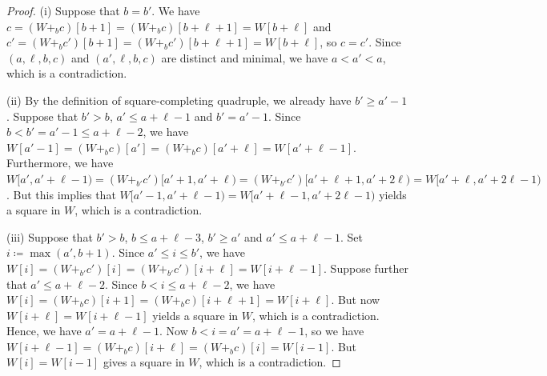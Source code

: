 \documentclass[12pt]{article}
\theoremstyle{plain}
\theoremstyle{definition}
\newcommand{\coleq}{\coloneq}
\begin{document}
	\begin{proof}
		(i) Suppose that $b=b'$. We have $c=(W+_bc)[b+1]=(W+_bc)[b+\ell+1]=W[b+\ell]$ and $c'=(W+_bc')[b+1]=(W+_bc')[b+\ell+1]=W[b+\ell]$, so $c=c'$. Since $(a,\ell,b,c)$ and $(a',\ell,b,c)$ are distinct and minimal, we have $a<a'<a$, which is a contradiction.
		
		(ii) By the definition of square-completing quadruple, we already have $b'\ge a'-1$. Suppose that $b'>b$, $a'\le a+\ell-1$ and $b'=a'-1$. Since $b<b'=a'-1\le a+\ell-2$, we have $W[a'-1]=(W+_bc)[a']=(W+_bc)[a'+\ell]=W[a'+\ell-1]$. Furthermore, we have $W[a',a'+\ell-1)=(W+_{b'}c')[a'+1,a'+\ell)=(W+_{b'}c')[a'+\ell+1,a'+2\ell)=W[a'+\ell,a'+2\ell-1)$. But this implies that $W[a'-1,a'+\ell-1)=W[a'+\ell-1,a'+2\ell-1)$ yields a square in $W$, which is a contradiction.
		
		(iii) Suppose that $b'>b$, $b\le a+\ell-3$, $b'\ge a'$ and $a'\le a+\ell-1$. Set $i\coleq\max(a',b+1)$. Since $a'\le i\le b'$, we have $W[i]=(W+_{b'}c')[i]=(W+_{b'}c')[i+\ell]=W[i+\ell-1]$. Suppose further that $a'\le a+\ell-2$. Since $b<i\le a+\ell-2$, we have $W[i]=(W+_bc)[i+1]=(W+_bc)[i+\ell+1]=W[i+\ell]$. But now $W[i+\ell]=W[i+\ell-1]$ yields a square in $W$, which is a contradiction. Hence, we have $a'=a+\ell-1$. Now $b < i = a' = a+\ell-1$, so we have $W[i+\ell-1]=(W+_bc)[i+\ell]=(W+_bc)[i]=W[i-1]$. But $W[i]=W[i-1]$ gives a square in $W$, which is a contradiction.
	\end{proof}
	
\end{document}
